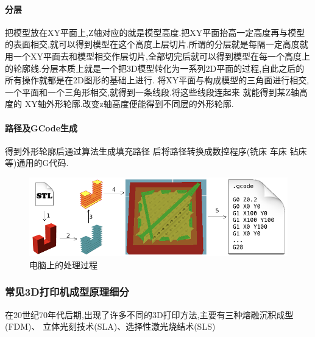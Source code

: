 \documentclass[a4paper,12pt,onecolumn,twoside]{article}
\begin{document}
\paragraph{分层}
把模型放在XY平面上,Z轴对应的就是模型高度.把XY平面抬高一定高度再与模型的表面相交,就可以得到模型在这个高度上层切片.所谓的分层就是每隔一定高度就用一个XY平面去和模型相交作层切片,全部切完后就可以得到模型在每一个高度上的轮廓线.分层本质上就是一个把3D模型转化为一系列2D平面的过程,自此之后的所有操作就都是在2D图形的基础上进行.
将XY平面与构成模型的三角面进行相交,一个平面和一个三角形相交,就得到一条线段.将这些线段连起来 就能得到某Z轴高度的 XY轴外形轮廓.改变z轴高度便能得到不同层的外形轮廓.
\paragraph{路径及GCode生成}
得到外形轮廓后通过算法生成填充路径 后将路径转换成数控程序(铣床 车床 钻床等)通用的G代码.
\begin{figure}[ht]
\centering
\includegraphics[width=0.9\linewidth]{stlToGcode.png}
\caption{电脑上的处理过程}
\end{figure}
\subsubsection{常见3D打印机成型原理细分}
在20世纪70年代后期,出现了许多不同的3D打印方法,主要有三种熔融沉积成型(FDM)、
立体光刻技术(SLA)、选择性激光烧结术(SLS)
\end{document}
